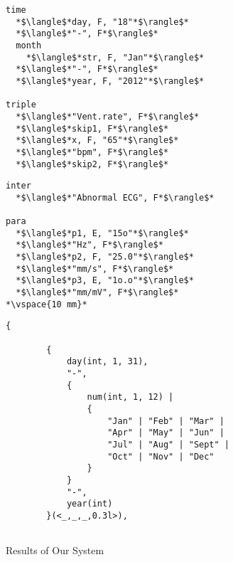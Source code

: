 \begin{figure}[h]
\RawFloats
\begin{minipage}{0.45\textwidth}
\newsavebox{\prflisting}
\begin{lrbox}{\prflisting}%
\begin{lstlisting}
time
  *$\langle$*day, F, "18"*$\rangle$*
  *$\langle$*"-", F*$\rangle$*
  month
    *$\langle$*str, F, "Jan"*$\rangle$*
  *$\langle$*"-", F*$\rangle$*
  *$\langle$*year, F, "2012"*$\rangle$*

triple
  *$\langle$*"Vent.rate", F*$\rangle$*
  *$\langle$*skip1, F*$\rangle$*
  *$\langle$*x, F, "65"*$\rangle$*
  *$\langle$*"bpm", F*$\rangle$*
  *$\langle$*skip2, F*$\rangle$*
\end{lstlisting}
\end{lrbox}

\newsavebox{\prslisting}
\begin{lrbox}{\prslisting}%
\begin{lstlisting}
inter
  *$\langle$*"Abnormal ECG", F*$\rangle$*

para
  *$\langle$*p1, E, "15o"*$\rangle$*
  *$\langle$*"Hz", F*$\rangle$*
  *$\langle$*p2, F, "25.0"*$\rangle$*
  *$\langle$*"mm/s", F*$\rangle$*
  *$\langle$*p3, E, "1o.o"*$\rangle$*
  *$\langle$*"mm/mV", F*$\rangle$*
*\vspace{10 mm}*
\end{lstlisting}
\end{lrbox}

\scalebox{0.6}{\usebox\prflisting}
\hspace{7 mm}
\subfloat{
\scalebox{0.6}{\usebox{\prslisting}}}
\caption{Results of Our System}
\label{fig:parseresult}
\end{minipage}
\hfill
\begin{minipage}{0.45\textwidth}
\newsavebox{\absflisting}
\begin{lrbox}{\absflisting}%
\begin{lstlisting}[basicstyle=\tiny,]
    {

        {
            day(int, 1, 31),
            "-",
            {
                num(int, 1, 12) |
                {
                    "Jan" | "Feb" | "Mar" | 
                    "Apr" | "May" | "Jun" | 
                    "Jul" | "Aug" | "Sept" | 
                    "Oct" | "Nov" | "Dec"
                }
            }
            "-",
            year(int)
        }(<_,_,_,0.3l>),


\end{lstlisting}
\end{lrbox}
\end{minipage}
\end{figure}
